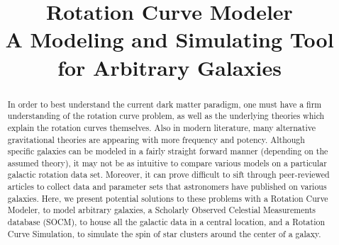 \documentclass[conference]{IEEEtran-modified}
\begin{document}
\title{Rotation Curve Modeler \\ \Large{A Modeling and Simulating Tool for Arbitrary Galaxies}}

\author{
\and
{}
}

\onecolumn

%	
%

	\maketitle
    \begin{abstract}
	
	In order to best understand the current dark matter paradigm, one must have a firm understanding of the rotation curve problem, as well as the underlying theories which explain the rotation curves themselves.  Also in modern literature, many alternative gravitational theories are appearing with more frequency and potency. Although specific galaxies can be modeled in a fairly straight forward manner (depending on the assumed theory), it may not be as intuitive to compare various models on a particular galactic rotation data set.  Moreover, it can prove difficult to sift through peer-reviewed articles to collect data and parameter sets that astronomers have published on various galaxies. Here, we present potential solutions to these problems with a Rotation Curve Modeler, to model arbitrary galaxies, a Scholarly Observed Celestial Measurements database (SOCM), to house all the galactic data in a central location, and a Rotation Curve Simulation, to simulate the spin of star clusters around the center of a galaxy.
	\end{abstract}
	
\end{document}
